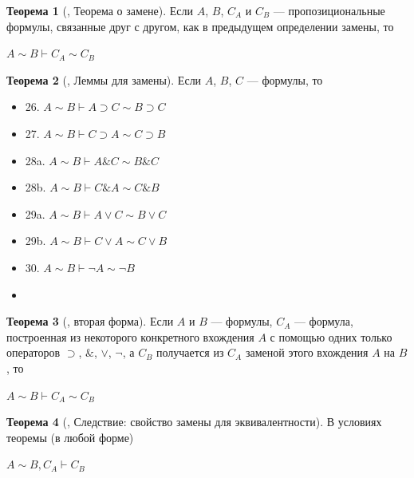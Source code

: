 \documentclass[a4paper, 12pt]{article}  %
\DeclareMathOperator{\conj}{\mathbb{\&}}
\theoremstyle{definition}
\newtheorem{theorem}{Теорема}
\begin{document}
	\begin{theorem}[, Теорема о замене]
		Если $A$, $B$, $C_A$ и $C_B$ --- пропозициональные формулы, связанные друг с другом, как в
		предыдущем определении замены, то		
		\begin{center}
			$A \sim B \vdash C_A \sim C_B$
		\end{center}
	\end{theorem}
	
	\setcounter{theorem}{5}
	
	\begin{theorem}[, Леммы для замены]
		Если $A$, $B$, $C$ ---  формулы, то
		\begin{multicols}{2}		
			\begin{itemize}[label={}]
				\setlength\itemsep{0pt}	
				\item 26. $A \sim B \vdash A \supset C \sim B \supset C$
				\item 27. $A \sim B \vdash C \supset A \sim C \supset B$
				\item 28a. $A \sim B \vdash A \conj C \sim B \conj C$
				\item 28b. $A \sim B \vdash C \conj A \sim C \conj B$
				\item 29a. $A \sim B \vdash A \vee C \sim B \vee C$
				\item 29b. $A \sim B \vdash C \vee A \sim C \vee B$
				\item 30. $A \sim B \vdash \neg A \sim \neg B$
				\item[\vspace{\fill}]
			\end{itemize}
		\end{multicols}
	\end{theorem}

	\setcounter{theorem}{5}
	
	\begin{theorem}[, вторая форма]
		Если $A$ и $B$ --- формулы, $C_A$ --- формула, построенная из некоторого конкретного
		вхождения $A$ с помощью одних только операторов $\supset$, $\conj$, $\vee$, $\neg$, а
		 $C_B$ получается из $C_A$ заменой этого вхождения $A$ на $B$, то		
		\begin{center}
			$A \sim B \vdash C_A \sim C_B$
		\end{center}
	\end{theorem}

	\setcounter{theorem}{5}
	
	\begin{theorem}[, Следствие: свойство замены для эквивалентности]
		В условиях теоремы (в любой форме)		
		\begin{center}
			$A \sim B, C_A \vdash C_B$
		\end{center}
	\end{theorem}
\end{document}
